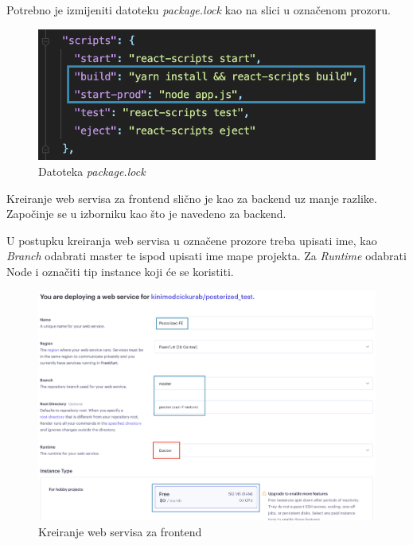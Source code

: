 			\pagebreak
			Potrebno je izmijeniti datoteku \textit{package.lock} kao na slici u označenom prozoru. 
			\begin{figure}[H]
				\includegraphics[scale=0.4]{slike/deploy/frontend7.png} %
				\centering
				\caption{Datoteka \textit{package.lock}}
				\label{fig:promjene}
			\end{figure}
			
			Kreiranje web servisa za frontend slično je kao za backend uz manje razlike. Započinje se u izborniku kao što je navedeno za backend.
			
			U postupku kreiranja web servisa u označene prozore treba upisati ime, kao \textit{Branch} odabrati master te ispod upisati ime mape projekta. Za \textit{Runtime} odabrati Node i označiti tip instance koji će se koristiti.
			\begin{figure}[H]
				\includegraphics[scale=0.3]{slike/deploy/frontend2.png} %
				\centering
				\caption{Kreiranje web servisa za frontend}
				\label{fig:promjene}
			\end{figure}
			
